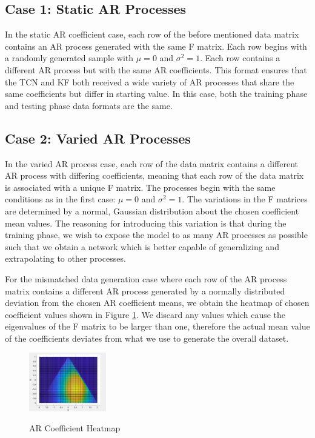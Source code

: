 \documentclass[twocolumn,letterpaper]{IEEEAerospaceCLS}  %
\begin{document}
\subsection{Case 1: Static AR Processes}

In the static AR coefficient case, each row of the before mentioned data matrix contains an AR process generated with the same F matrix. Each row begins with a randomly generated sample with $\mu = 0$ and $\sigma^2 = 1$. Each row contains a different AR process but with the same AR coefficients. This format ensures that the TCN and KF both received a wide variety of AR processes that share the same coefficients but differ in starting value. In this case, both the training phase and testing phase data formats are the same. 

\subsection{Case 2: Varied AR Processes}

In the varied AR process case, each row of the data matrix contains a different AR process with differing coefficients, meaning that each row of the data matrix is associated with a unique F matrix.  The processes begin with the same conditions as in the first case:  $\mu = 0$ and $\sigma^2 = 1$. The variations in the F matrices are determined by a normal, Gaussian distribution about the chosen coefficient mean values. The reasoning for introducing this variation is that during the training phase, we wish to expose the model to as many AR processes as possible such that we obtain a network which is better capable of generalizing and extrapolating to other processes. 

For the mismatched data generation case where each row of the AR process matrix contains a different AR process generated by a normally distributed deviation from the chosen AR coefficient means, we obtain the heatmap of chosen coefficient values shown in Figure \ref{heatmap}. We discard any values which cause the eigenvalues of the F matrix to be larger than one, therefore the actual mean value of the coefficients deviates from what we use to generate the overall dataset. 

\begin{figure}[!h]
\centering\includegraphics[width=0.3\textwidth]{figs/heatmap.PNG}\\
\caption{AR Coefficient Heatmap}
\label{heatmap}
\end{figure}
\end{document}

